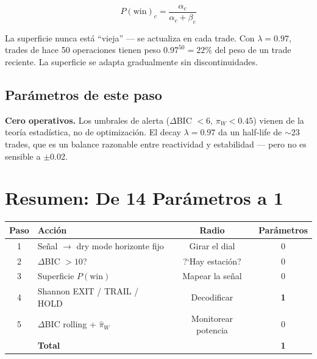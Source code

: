 \documentclass[11pt,a4paper]{article}
\newcommand{\pw}{P(\text{win})}
\begin{document}
\begin{equation}
\pw_c = \frac{\alpha_c}{\alpha_c + \beta_c}
\end{equation}

La superficie nunca est\'a ``vieja'' --- se actualiza en cada trade.
Con $\lambda = 0.97$, trades de hace 50 operaciones tienen peso
$0.97^{50} = 22\%$ del peso de un trade reciente. La superficie se
adapta gradualmente sin discontinuidades.

\subsection{Par\'ametros de este paso}

\textbf{Cero operativos.} Los umbrales de alerta ($\Delta$BIC $< 6$,
$\pi_W < 0.45$) vienen de la teor\'ia estad\'istica, no de
optimizaci\'on. El decay $\lambda = 0.97$ da un half-life de
$\sim$23 trades, que es un balance razonable entre reactividad y
estabilidad --- pero no es sensible a $\pm$0.02.


\section{Resumen: De 14 Par\'ametros a 1}
\label{sec:resumen}

\begin{tcolorbox}[key, title=El framework completo]
\begin{center}
\renewcommand{\arraystretch}{1.4}
\begin{tabular}{clcc}
\toprule
\textbf{Paso} & \textbf{Acci\'on} & \textbf{Radio} & \textbf{Par\'ametros} \\
\midrule
1 & Se\~nal $\to$ dry mode horizonte fijo & Girar el dial & 0 \\
2 & $\Delta$BIC $> 10$? & ?`Hay estaci\'on? & 0 \\
3 & Superficie $\pw$ & Mapear la se\~nal & 0 \\
4 & Shannon EXIT / TRAIL / HOLD & Decodificar & \textbf{1} \\
5 & $\Delta$BIC rolling + $\hat{\pi}_W$ & Monitorear potencia & 0 \\
\midrule
& \textbf{Total} & & \textbf{1} \\
\bottomrule
\end{tabular}
\end{center}
\end{tcolorbox}
\end{document}
